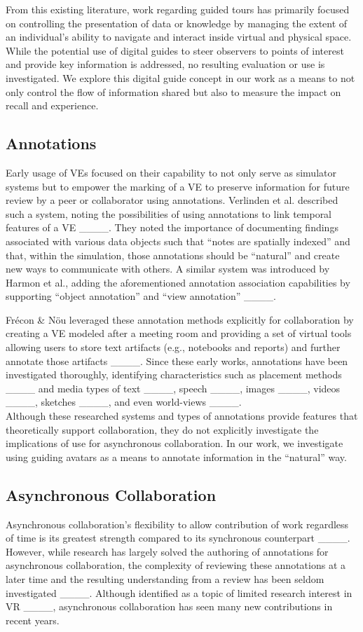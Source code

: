 \noindent From this existing literature, work regarding guided tours has primarily focused on controlling the presentation of data or knowledge by managing the extent of an individual's ability to navigate and interact inside virtual and physical space. 
While the potential use of digital guides to steer observers to points of interest and provide key information is addressed, no resulting evaluation or use is investigated.
We explore this digital guide concept in our work as a means to not only control the flow of information shared but also to measure the impact on recall and experience.


\subsection{Annotations}
Early usage of VEs focused on their capability to not only serve as simulator systems but to empower the marking of a VE to preserve information for future review by a peer or collaborator using annotations.
Verlinden et al. described such a system, noting the possibilities of using annotations to link temporal features of a VE ____.
They noted the importance of documenting findings associated with various data objects such that ``notes are spatially indexed'' and that, within the simulation, those annotations should be ``natural'' and create new ways to communicate with others.
A similar system was introduced by Harmon et al., adding the aforementioned annotation association capabilities by supporting ``object annotation'' and ``view annotation'' ____. 

Frécon \& Nöu leveraged these annotation methods explicitly for collaboration by creating a VE modeled after a meeting room and providing a set of virtual tools allowing users to store text artifacts (e.g., notebooks and reports) and further annotate those artifacts ____.
Since these early works, annotations have been investigated thoroughly, identifying characteristics such as placement methods ____ and media types of text ____, speech ____, images ____, videos ____, sketches ____, and even world-views ____.\\

\noindent Although these researched systems and types of annotations provide features that theoretically support collaboration, they do not explicitly investigate the implications of use for asynchronous collaboration.
In our work, we investigate using guiding avatars as a means to annotate information in the ``natural'' way.


\subsection{Asynchronous Collaboration}
Asynchronous collaboration's flexibility to allow contribution of work regardless of time is its greatest strength compared to its synchronous counterpart ____.
However, while research has largely solved the authoring of annotations for asynchronous collaboration, the complexity of reviewing these annotations at a later time and the resulting understanding from a review has been seldom investigated ____.
Although identified as a topic of limited research interest in VR ____, asynchronous collaboration has seen many new contributions in recent years.

